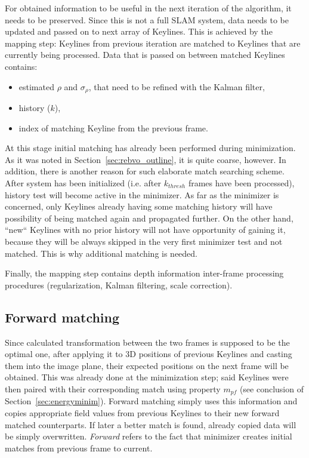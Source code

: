 For obtained information to be useful in the next iteration of the algorithm, it needs to be preserved. Since this is not a full SLAM system, data needs to be updated and passed on to next array of Keylines. This is achieved by the mapping step: Keylines from previous iteration are matched to Keylines that are currently being processed. Data that is passed on between matched Keylines contains:

\begin{itemize}
	\item estimated $\rho$ and $\sigma_{\rho}$, that need to be refined with the Kalman filter,
	\item history ($k$),
	\item index of matching Keyline from the previous frame.
\end{itemize}

At this stage initial matching has already been performed during minimization. As it was noted in Section~\ref{sec:rebvo_outline}, it is quite coarse, however. In addition, there is another reason for such elaborate match searching scheme. After system has been initialized (i.e. after $k_{thresh}$ frames have been processed), history test will become active in the minimizer. As far as the minimizer is concerned, only Keylines already having some matching history will have possibility of being matched again and propagated further. On the other hand, ``new`` Keylines with no prior history will not have opportunity of gaining it, because they will be always skipped in the very first minimizer test and not matched. This is why additional matching is needed.

Finally, the mapping step contains depth information inter-frame processing procedures (regularization, Kalman filtering, scale correction).

\subsection{Forward matching}


Since calculated transformation between the two frames is supposed to be the optimal one, after applying it to 3D positions of previous Keylines and casting them into the image plane, their expected positions on the next frame will be obtained. This was already done at the minimization step; said Keylines were then paired with their corresponding match using property $m_{pf}$ (see conclusion of Section~\ref{sec:energyminim}). Forward matching simply uses this information and copies appropriate field values from previous Keylines to their new forward matched counterparts. If later a better match is found, already copied data will be simply overwritten. \textit{Forward} refers to the fact that minimizer creates initial matches from previous frame to current.

